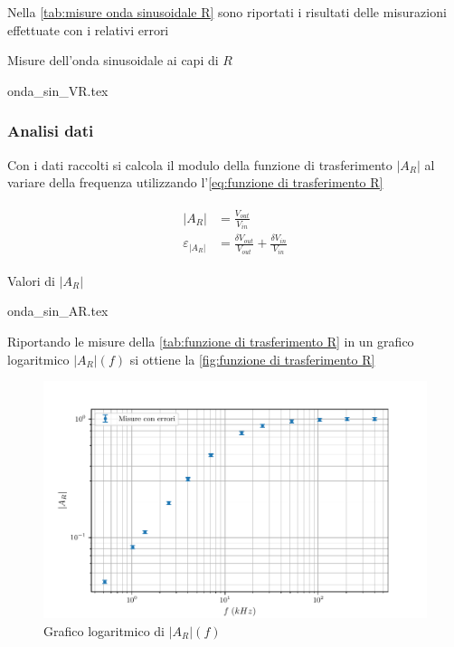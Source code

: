 \documentclass[11pt, a4paper]{article}
\numberwithin{equation}{section} %
\begin{document}
Nella \autoref{tab:misure onda sinusoidale R} sono riportati i risultati delle misurazioni effettuate con i relativi errori

\begin{table}[ht!]
    \centering
    \caption{Misure dell'onda sinusoidale ai capi di $R$}
    {onda_sin_VR.tex}
    \label{tab:misure onda sinusoidale R}
\end{table}


\subsubsection{Analisi dati}

Con i dati raccolti si calcola il modulo della funzione di trasferimento $|A_{R}|$ al variare della frequenza utilizzando l'\autoref{eq:funzione di trasferimento R}

\begin{align} \label{eq:funzione di trasferimento R}
    \begin{split}
        |A_{R}| &= \frac{V_{out}}{V_{in}} \\
        \varepsilon_{|A_{R}|} &= \frac{\delta V_{out}}{V_{out}} + \frac{\delta V_{in}}{V_{in}}
    \end{split}
\end{align}

\begin{table}[ht!]
    \centering
    \caption{Valori di $|A_{R}|$}
    {onda_sin_AR.tex}
    \label{tab:funzione di trasferimento R}
\end{table}

Riportando le misure della \autoref{tab:funzione di trasferimento R} in un grafico logaritmico $|A_{R}|(f)$ si ottiene la \autoref{fig:funzione di trasferimento R}

\begin{figure}[ht!]
    \includegraphics{onda_sin_AR(f).pdf}
    \caption{Grafico logaritmico di $|A_{R}|(f)$}
    \label{fig:funzione di trasferimento R}
\end{figure}
\end{document}
